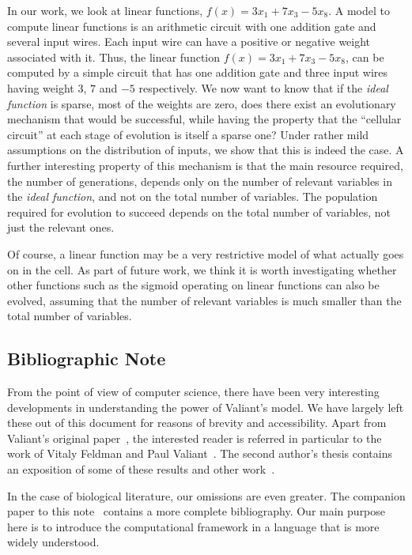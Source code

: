 \documentclass{acmtr2e}
\begin{document}
In our work, we look at linear functions, \eg $f(x) = 3x_1 + 7 x_3 - 5 x_8$.  A
model to compute linear functions is an arithmetic circuit with one addition
gate and several input wires. Each input wire can have a positive or negative
weight associated with it.  Thus, the linear function $f(x) = 3x_1 + 7 x_3
-5x_8$, can be computed by a simple circuit that has one addition gate and three
input wires having weight $3$, $7$ and $-5$ respectively. We now want to know
that if the \emph{ideal function} is sparse, \ie most of the weights are zero,
does there exist an evolutionary mechanism that would be successful, while
having the property that the ``cellular circuit'' at each stage of evolution is
itself a sparse one? Under rather mild assumptions on the distribution of
inputs, we show that this is indeed the case. A further interesting property of
this mechanism is that the main resource required, the number of generations,
depends only on the number of relevant variables in the \emph{ideal function},
and not on the total number of variables. The population required for evolution
to succeed depends on the total number of variables, not just the relevant ones.

Of course, a linear function may be a very restrictive model of what actually
goes on in the cell. As part of future work, we think it is worth investigating
whether other functions such as the sigmoid operating on linear functions can also
be evolved, assuming that the number of relevant variables is much smaller than
the total number of variables.

\subsection*{Bibliographic Note}

From the point of view of computer science, there have been very interesting
developments in understanding the power of Valiant's model. We have largely left
these out of this document for reasons of brevity and accessibility. Apart from
Valiant's original paper~\cite{Valiant:2009-evolvability},
the interested reader is referred in particular to the work of Vitaly Feldman
and Paul Valiant~\cite{Feldman:2008-evolvability,Feldman:2009-robustness,Feldman:2011-LTF,Valiant:2012-real}.
The second author's thesis contains an exposition of some of these results and
other work~\cite{Kanade:2012-thesis}.

In the case of biological literature, our omissions are even greater. The
companion paper to this note~\cite{AK:2013} contains a more complete
bibliography. Our main purpose here is to introduce the computational framework
in a language that is more widely understood.
\end{document}
